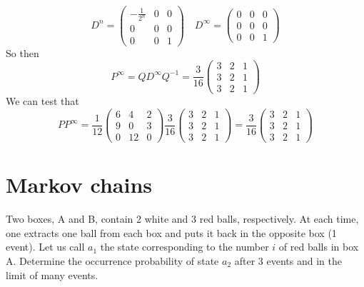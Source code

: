 \documentclass[../main.tex]{subfiles}
\begin{document}
\[
D^n = \begin{pmatrix}
-\frac{1}{2^n} & 0 & 0 \\
0 & 0 & 0 \\
0 & 0 & 1
\end{pmatrix}
\quad
D^{\infty} = \begin{pmatrix}
0 & 0 & 0 \\
0 & 0 & 0 \\
0 & 0 & 1
\end{pmatrix}
\]
So then
\[
P^\infty = QD^{\infty} Q^{-1} = \frac{3}{16}\begin{pmatrix}
3 & 2 & 1 \\
3 & 2 & 1 \\
3 & 2 & 1
\end{pmatrix}
\]
We can test that
\[
PP^\infty = \frac{1}{12} \begin{pmatrix}
6 & 4&2 \\
9&0&3 \\
0&12&0
\end{pmatrix}
\frac{3}{16}\begin{pmatrix}
3 & 2 & 1 \\
3 & 2 & 1 \\
3 & 2 & 1
\end{pmatrix} =
\frac{3}{16}\begin{pmatrix}
3 & 2 & 1 \\
3 & 2 & 1 \\
3 & 2 & 1
\end{pmatrix}
\]

\section{Markov chains}
Two boxes, A and B, contain 2 white and 3 red balls, respectively. At each time, one extracts one ball from each box and puts it back in the opposite box (1 event). Let us call $a_1$ the state corresponding to the number $i$ of red balls in box A. Determine the occurrence probability of state $a_2$ after 3 events and in the limit of many events.
\end{document}
